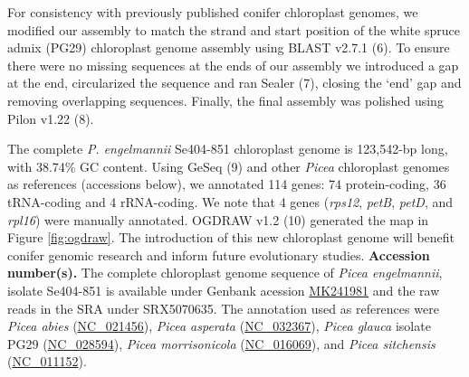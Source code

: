\documentclass[titlepage,11pt, oneside]{article}   	%
\begin{document}
\newline
\par
For consistency with previously published conifer chloroplast genomes, we modified our assembly to match the strand and start position of the white spruce admix (PG29) chloroplast genome assembly using BLAST v2.7.1 (6). To ensure there were no missing sequences at the ends of our assembly we introduced a gap at the end, circularized the sequence and ran Sealer (7), closing the ‘end’ gap and removing overlapping sequences. Finally, the final assembly was polished using Pilon v1.22 (8).
\newline
\par
The complete \textit{P. engelmannii} Se404-851 chloroplast genome is 123,542-bp long, with 38.74\% GC content. Using GeSeq (9) and other \textit{Picea} chloroplast genomes as references (accessions below), we annotated 114 genes: 74 protein-coding, 36 tRNA-coding and 4 rRNA-coding. We note that 4 genes (\textit{rps12}, \textit{petB}, \textit{petD}, and \textit{rpl16}) were manually annotated. OGDRAW v1.2 (10) generated the map in Figure \ref{fig:ogdraw}. The introduction of this new chloroplast genome will benefit conifer genomic research and inform future evolutionary studies.
\newline
\newline
\textbf{Accession number(s).} The complete chloroplast genome sequence of \textit{Picea engelmannii}, isolate Se404-851 is available under Genbank acession \href{https://www.ncbi.nlm.nih.gov/nuccore/MK241981}{MK241981} and the raw reads in the SRA under SRX5070635. The annotation used as references were \textit{Picea abies} (\href{https://www.ncbi.nlm.nih.gov/nuccore/NC_021456}{NC\_021456}), \textit{Picea asperata} (\href{https://www.ncbi.nlm.nih.gov/nuccore/NC_032367}{NC\_032367}), \textit{Picea glauca} isolate PG29 (\href{https://www.ncbi.nlm.nih.gov/nuccore/NC_028594}{NC\_028594}), \textit{Picea morrisonicola} (\href{https://www.ncbi.nlm.nih.gov/nuccore/NC_016069}{NC\_016069}), and \textit{Picea sitchensis} (\href{https://www.ncbi.nlm.nih.gov/nuccore/NC_011152}{NC\_011152}).
\end{document}
